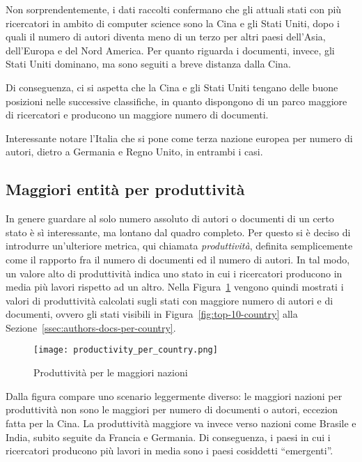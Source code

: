 Non sorprendentemente, i dati raccolti confermano che gli attuali stati
con più ricercatori in ambito di computer science sono la Cina e gli Stati Uniti,
dopo i quali il numero di autori diventa meno di un terzo per altri paesi
dell'Asia, dell'Europa e del Nord America.
Per quanto riguarda i documenti, invece, gli Stati Uniti dominano, ma sono
seguiti a breve distanza dalla Cina.

Di conseguenza, ci si aspetta che la Cina e gli Stati Uniti tengano delle buone
posizioni nelle successive classifiche, in quanto dispongono di un parco maggiore
di ricercatori e producono un maggiore numero di documenti.

Interessante notare l'Italia che si pone come terza nazione europea per numero
di autori, dietro a Germania e Regno Unito, in entrambi i casi.

\subsection{Maggiori entità per produttività}

In genere guardare al solo numero assoluto di autori o documenti di un certo
stato è sì interessante, ma lontano dal quadro completo. Per questo si è
deciso di introdurre un'ulteriore metrica, qui chiamata \textit{produttività},
definita semplicemente come il rapporto fra il numero di documenti ed il
numero di autori. In tal modo, un valore alto di produttività indica uno
stato in cui i ricercatori producono in media più lavori rispetto ad un
altro. Nella Figura~\ref{fig:productivity-per-country} vengono quindi mostrati i valori
di produttività calcolati sugli stati con maggiore numero di autori e di
documenti, ovvero gli stati visibili in Figura~\ref{fig:top-10-country} alla
Sezione~\ref{ssec:authors-docs-per-country}.

\begin{figure}[tb]
  \centering
  \texttt{[image: productivity\_per\_country.png]}
  \caption{Produttività per le maggiori nazioni}
  \label{fig:productivity-per-country}
\end{figure}

Dalla figura compare uno scenario leggermente diverso: le maggiori nazioni
per produttività non sono le maggiori per numero di documenti o autori, eccezion
fatta per la Cina. La produttività maggiore va invece verso nazioni come Brasile
e India, subito seguite da Francia e Germania.
Di conseguenza, i paesi in cui i ricercatori producono più lavori in media
sono i paesi cosiddetti ``emergenti''.


